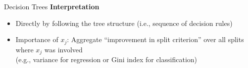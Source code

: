 \documentclass[11pt,compress,t,notes=noshow, aspectratio=169, xcolor=table]{beamer}
\begin{document}
\begin{frame}{Decision Trees }
\medskip
\pause
\textbf{Interpretation}
\begin{itemize}
    \item Directly by following the tree structure (i.e., sequence of decision rules)
    \item Importance of $x_j$: Aggregate ``improvement in split criterion'' over all splits where $x_j$ was involved\\
    (e.g., variance for regression or Gini index for classification)
\end{itemize}



\end{frame}
\end{document}
